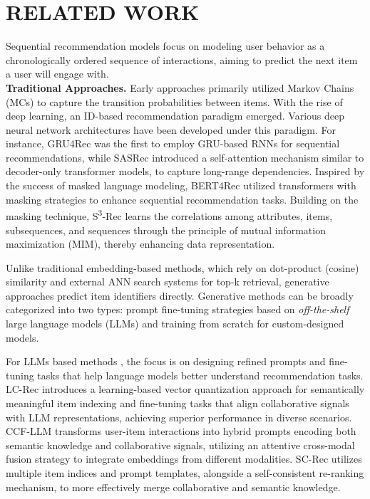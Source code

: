 \section{RELATED WORK}
 Sequential recommendation models focus on modeling user behavior as a chronologically ordered sequence of interactions, aiming to predict the next item a user will engage with.\\
{\bfseries Traditional Approaches.} Early approaches primarily utilized Markov Chains (MCs)  \cite{rendle2010factorizing, he2016fusing} to capture the transition probabilities between items. With the rise of deep learning, an ID-based recommendation paradigm emerged. Various deep neural network architectures have been developed under this paradigm. For instance, GRU4Rec \cite{jannach2017recurrent} was the first to employ GRU-based RNNs for sequential recommendations, while SASRec \cite{kang2018self} introduced a self-attention mechanism similar to decoder-only transformer models, to capture long-range dependencies. Inspired by the success of masked language modeling, BERT4Rec \cite{sun2019bert4rec} utilized transformers with masking strategies to enhance sequential recommendation tasks. Building on the masking technique, S\textsuperscript{3}-Rec \cite{zhou2020s3} learns the correlations among attributes, items, subsequences, and sequences through the principle of mutual information maximization (MIM), thereby enhancing data representation.

 Unlike traditional embedding-based methods, which rely on dot-product (cosine) similarity and external ANN search systems for top-k retrieval, generative approaches predict item identifiers directly. 
%
Generative methods can be broadly categorized into two types: prompt fine-tuning strategies based on \textit{off-the-shelf} large language models (LLMs) and training from scratch for custom-designed models.

For LLMs based methods \cite{zheng2024adapting, lin2024bridging, liu2024collaborative, kim2024sc, ji2024genrec}, the focus is on designing refined prompts and fine-tuning tasks that help language models better understand recommendation tasks. LC-Rec \cite{zheng2024adapting} introduces a learning-based vector quantization approach for semantically meaningful item indexing and fine-tuning tasks that align collaborative signals with LLM representations, achieving superior performance in diverse scenarios. CCF-LLM \cite{liu2024collaborative} transforms user-item interactions into hybrid prompts encoding both semantic knowledge and collaborative signals, utilizing an attentive cross-modal fusion strategy to integrate embeddings from different modalities. SC-Rec \cite{kim2024sc} utilizes multiple item indices and prompt templates, alongside a self-consistent re-ranking mechanism, to more effectively merge collaborative and semantic knowledge.

